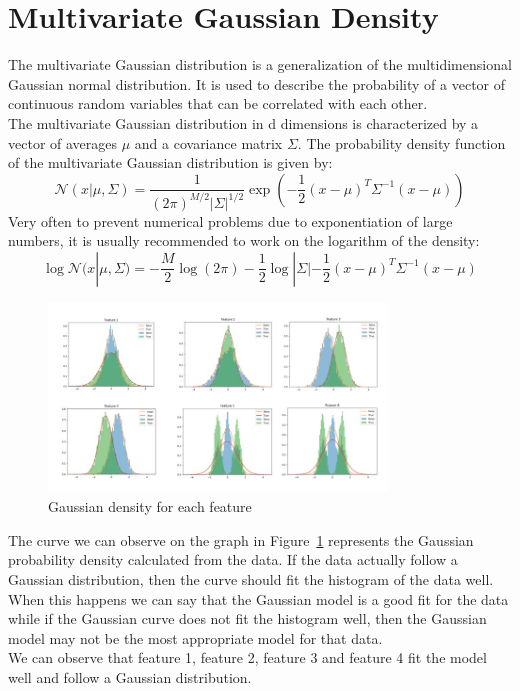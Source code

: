 \documentclass{article}
\begin{document}
\section{Multivariate Gaussian Density}
The multivariate Gaussian distribution is a generalization of the multidimensional Gaussian normal distribution. It is used to describe the probability of a vector of continuous random variables that can be correlated with each other.\\
The multivariate Gaussian distribution in d dimensions is characterized by a vector of averages \(\mu\)  and a covariance matrix \(\Sigma\). The probability density function of the multivariate Gaussian distribution is given by:
\begin{equation}
    \mathcal{N}(x|\mu,\Sigma ) = \frac{1}{(2\pi)^{M/2}|\Sigma|^{1/2}} \exp\left(-\frac{1}{2}(x-\mu)^T\Sigma^{-1}(x-\mu)\right)
\end{equation}
Very often to prevent numerical problems due to exponentiation of large numbers, it is usually recommended to work on the logarithm of the density:
\begin{equation}
    \log \mathcal{N}(x|\mu,\Sigma ) = - \frac{M}{2} \log(2\pi) -\frac{1}{2} \log |\Sigma| - \frac{1}{2}(x-\mu)^T\Sigma^{-1}(x-\mu) 
\end{equation}
\begin{figure}[H]
    \centering
    \includegraphics[width=0.8\textwidth]{./img/GaussianDensity.jpeg}
    \caption{Gaussian density for each feature}
    \label{fig:gaussianD}
\end{figure} 
The curve we can observe on the graph in Figure~\ref{fig:gaussianD} represents the Gaussian probability density calculated from the data. If the data actually follow a Gaussian distribution, then the curve should fit the histogram of the data well. When this happens we can say that the Gaussian model is a good fit for the data while if the Gaussian curve does not fit the histogram well, then the Gaussian model may not be the most appropriate model for that data.\\
We can observe that feature 1, feature 2, feature 3 and feature 4 fit the model well and follow a Gaussian distribution.
\end{document}
